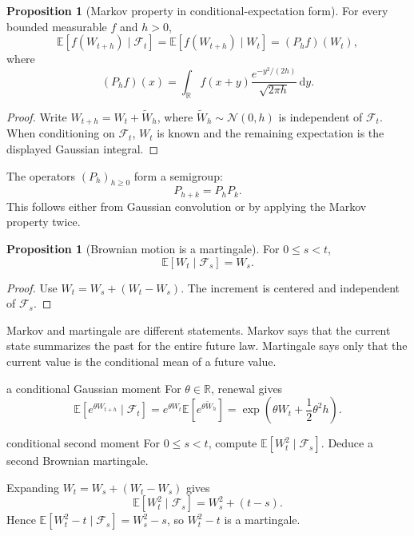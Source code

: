 \documentclass[10pt]{article}
\newcommand{\E}{\mathbb E}
\newcommand{\R}{\mathbb R}
\newcommand{\1}{\mathbf 1}
\newcommand{\cF}{\mathcal F}
\newcommand{\dd}{\,\mathrm d}
\theoremstyle{definition}
\newtheorem{proposition}[definition]{Proposition}
\begin{document}
\begin{proposition}[Markov property in conditional-expectation form]
For every bounded measurable \(f\) and \(h>0\),
\[
\boxed{
\E[f(W_{t+h})\mid\cF_t]
=\E[f(W_{t+h})\mid W_t]
=(P_hf)(W_t),
}
\]
where
\[
(P_hf)(x)=\int_{\R}f(x+y)
\frac{e^{-y^2/(2h)}}{\sqrt{2\pi h}}\dd y.
\]
\end{proposition}

\begin{proof}
Write \(W_{t+h}=W_t+\widetilde W_h\), where
\(\widetilde W_h\sim\mathcal N(0,h)\) is independent of \(\cF_t\). When
conditioning on \(\cF_t\), \(W_t\) is known and the remaining expectation is
the displayed Gaussian integral.
\end{proof}

The operators \((P_h)_{h\geq0}\) form a semigroup:
\[
P_{h+k}=P_hP_k.
\]
This follows either from Gaussian convolution or by applying the Markov
property twice.

\begin{proposition}[Brownian motion is a martingale]
For \(0\leq s<t\),
\[
\E[W_t\mid\cF_s]=W_s.
\]
\end{proposition}

\begin{proof}
Use \(W_t=W_s+(W_t-W_s)\). The increment is centered and independent of
\(\cF_s\).
\end{proof}

Markov and martingale are different statements. Markov says that the current
state summarizes the past for the entire future law. Martingale says only that
the current value is the conditional mean of a future value.

\begin{boardexample}{a conditional Gaussian moment}
For \(\theta\in\R\), renewal gives
\[
\E[e^{\theta W_{t+h}}\mid\cF_t]
=e^{\theta W_t}\E[e^{\theta\widetilde W_h}]
=\exp\!\left(\theta W_t+\frac12\theta^2h\right).
\]
\end{boardexample}

\begin{studentexercise}{conditional second moment}
For \(0\leq s<t\), compute \(\E[W_t^2\mid\cF_s]\). Deduce a second
Brownian martingale.
\end{studentexercise}
\begin{shortsolution}
Expanding \(W_t=W_s+(W_t-W_s)\) gives
\[
\E[W_t^2\mid\cF_s]=W_s^2+(t-s).
\]
Hence \(\E[W_t^2-t\mid\cF_s]=W_s^2-s\), so \(W_t^2-t\) is a martingale.
\end{shortsolution}
\end{document}
